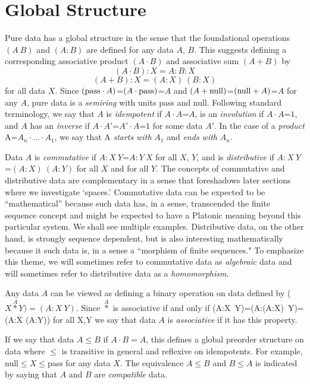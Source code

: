 \documentclass[11pt]{article}
\begin{document}
\section{Global Structure} 

    Pure data has a global structure in the sense that the foundational operations $(A\ B)$ and $(A:B)$ are defined for any data $A$, $B$.  
This suggests defining a corresponding associative product $(A\cdot B)$ and associative sum $(A+B)$ by    
\begin{equation}
(A \cdot B):X = A:B:X 
\end{equation}
\begin{equation}
(A+B):X = (A:X)\ (B:X) 
\end{equation}
for all data $X$.  Since $({\rm pass}\cdot A)$=$(A\cdot {\rm pass})$=$A$ and $(A+{\rm null})$=$({\rm null}+A)$=$A$ for any $A$, pure data is a {\it semiring} with units pass and null.  
Following standard terminology, we say that $A$ is {\it idempotent} if $A\cdot A$=$A$, is an {\it involution} if $A\cdot A$=$1$, and $A$ has an {\it inverse} if $A\cdot A'$=$A'\cdot A$=$1$ for some data $A'$.   
In the case of a {\it product}  A=$A_n\cdot\dots\cdot A_1$, we say that A {\it starts with} $A_1$ and {\it ends with} $A_n$.   

Data $A$ is {\it commutative} if $A:X\ Y$=$A:Y\ X$ for all $X$, $Y$, and is {\it distributive} if $A:X\ Y$=$(A:X)\ (A:Y)$ for all $X$ and for all $Y$.  
The concepts of commutative and distributive data are complementary in a sense that foreshadows later sections where we investigate `spaces.'  
Commutative data can be expected to be ``mathematical'' because such data has, in a sense, transcended the finite sequence concept and might be 
expected to have a Platonic meaning beyond this particular system.  We shall see multiple examples.  Distributive data, on the other hand, is strongly 
sequence dependent, but is also interesting mathematically because it such data is, in a sense a ``morphism of finite sequences."  To emphasize this theme, we will sometimes refer 
to commutative data as {\it algebraic} data and will sometimes refer to distributive data as a {\it homomorphism}. 

Any data $A$ can be viewed as defining a binary operation on data defined by ($X{\overset A\ast}Y)=(A:X\ Y)$.  Since ${\overset A\ast}$ is associative if and only if 
 (A:X\ Y)=(A:(A:X)\ Y)=(A:X (A:Y)) for all X,Y we say that data $A$ is {\it associative} if it has this property.  

     If we say that data $A\leq B$ if $A\cdot B=A$, this defines a global preorder structure on data where 
$\leq$ is transitive in general and reflexive on idempotents.  For example, null$\leq X\leq$pass for any data $X$.  
The equivalence $A\leq B$ and $B\leq A$ is indicated by saying that $A$ and $B$ are {\it compatible} data.
 
\end{document}
